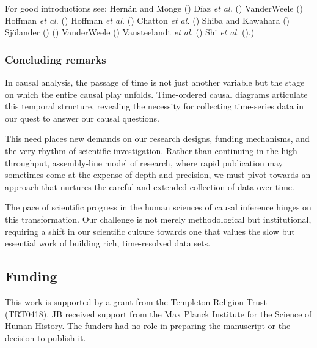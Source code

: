 \documentclass[
  singlecolumn,
  9pt]{article}
\begin{document}
For good introductions see: Hernán and Monge
() Díaz \emph{et al.}
() VanderWeele
() Hoffman \emph{et al.}
() Hoffman \emph{et al.}
() Chatton \emph{et al.}
() Shiba and Kawahara
() Sjölander
()
() VanderWeele
() Vansteelandt \emph{et al.}
() Shi \emph{et al.}
().)

\subsubsection{Concluding remarks}\label{concluding-remarks}

In causal analysis, the passage of time is not just another variable but
the stage on which the entire causal play unfolds. Time-ordered causal
diagrams articulate this temporal structure, revealing the necessity for
collecting time-series data in our quest to answer our causal questions.

This need places new demands on our research designs, funding
mechanisms, and the very rhythm of scientific investigation. Rather than
continuing in the high-throughput, assembly-line model of research,
where rapid publication may sometimes come at the expense of depth and
precision, we must pivot towards an approach that nurtures the careful
and extended collection of data over time.

The pace of scientific progress in the human sciences of causal
inference hinges on this transformation. Our challenge is not merely
methodological but institutional, requiring a shift in our scientific
culture towards one that values the slow but essential work of building
rich, time-resolved data sets.

\newpage{}

\subsection{Funding}\label{funding}

This work is supported by a grant from the Templeton Religion Trust
(TRT0418). JB received support from the Max Planck Institute for the
Science of Human History. The funders had no role in preparing the
manuscript or the decision to publish it.
\end{document}
